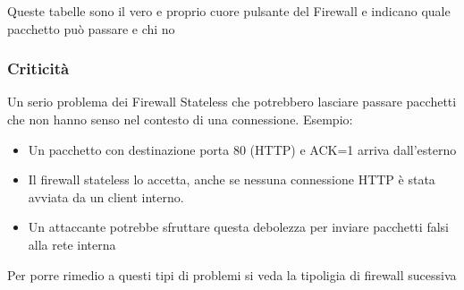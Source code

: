 Queste tabelle sono il vero e proprio cuore pulsante del Firewall e indicano quale pacchetto può passare e chi no
\subsubsection{Criticità}
Un serio problema dei Firewall Stateless che potrebbero lasciare passare pacchetti che non hanno senso nel contesto di una connessione.
Esempio:
\begin{itemize}
    \item Un pacchetto con destinazione porta 80 (HTTP) e ACK=1 arriva dall'esterno
    \item Il firewall stateless lo accetta, anche se nessuna connessione HTTP è stata avviata da un client interno.
    \item Un attaccante potrebbe sfruttare questa debolezza per inviare pacchetti falsi alla rete interna
\end{itemize}

Per porre rimedio a questi tipi di problemi si veda la tipoligia di firewall sucessiva


